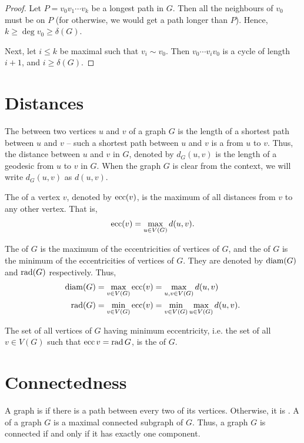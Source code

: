 \begin{proof}
Let $P = v_0 v_1 \cdots v_k$ be a longest path in $G$. Then all the neighbours of $v_0$ must be on $P$ (for otherwise, we would get a path longer than $P$). Hence, $k \ge \deg v_0 \ge \delta(G)$.

Next, let $i \le k$ be maximal such that $v_i \sim v_0$. Then $v_0 \cdots v_i v_0$ is a cycle of length $i + 1$, and $i \ge \delta(G)$.
\end{proof}


\section{Distances}\label{sec:Distances}

The  between two vertices $u$ and $v$ of a graph $G$ is the length of a shortest path between $u$ and $v$ -- such a shortest path between $u$ and $v$ is a  from $u$ to $v$. Thus, the distance between $u$ and $v$ in $G$, denoted by $d_G(u, v)$ is the length of a geodesic from $u$ to $v$ in $G$. When the graph $G$ is clear from the context, we will write $d_G(u, v)$ as $d(u, v)$.

The  of a vertex $v$, denoted by $\operatorname{ecc}(v)$, is the maximum of all distances from $v$ to any other vertex. That is,
\begin{equation*}
    \operatorname{ecc}(v) = \max_{u \in V(G)} d(u, v) .
\end{equation*}

The  of $G$ is the maximum of the eccentricities of vertices of $G$, and the  of $G$ is the minimum of the eccentricities of vertices of $G$. They are denoted by $\operatorname{diam}(G)$ and $\operatorname{rad}(G)$ respectively. Thus,
\begin{align*}
    \operatorname{diam}(G) & = \max_{v \in V(G)} \operatorname{ecc}(v)= \max_{u, v \in V(G)} d(u, v) \\
    \operatorname{rad}(G) & = \min_{v \in V(G)}\operatorname{ecc}(v) = \min_{v \in V(G)} \max_{u \in V(G)} d(u, v).
\end{align*}

The set of all vertices of $G$ having minimum eccentricity, i.e. the set of all $v \in V(G)$ such that $\operatorname{ecc} v = \operatorname{rad} G$, is the  of $G$.


\section{Connectedness}\label{sec:Connectedness}

A graph is  if there is a path between every two of its vertices. Otherwise, it is . A  of a graph $G$ is a maximal connected subgraph of $G$. Thus, a graph $G$ is connected if and only if it has exactly one component.

